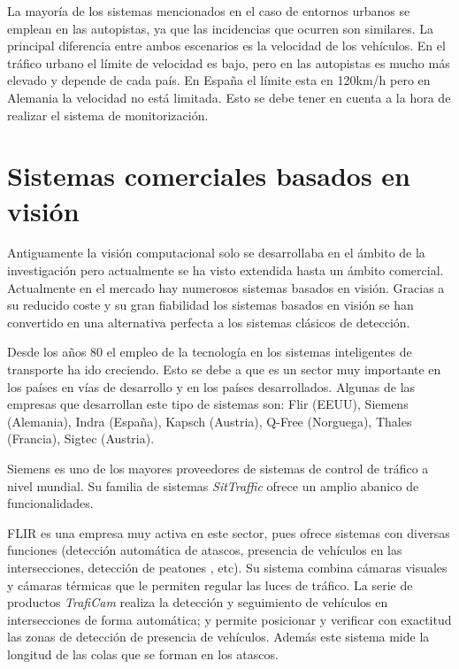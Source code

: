 La mayoría de los sistemas mencionados en el caso de entornos urbanos se emplean en las autopistas, ya que las incidencias que ocurren son similares. La principal diferencia entre ambos escenarios es la velocidad de los vehículos. En el tráfico urbano el límite de velocidad es bajo, pero en las autopistas es mucho más elevado y depende de cada país. En España el límite esta en 120km/h pero en Alemania la velocidad no está limitada. Esto se debe tener en cuenta a la hora de realizar el sistema de monitorización.

\section{Sistemas comerciales basados en visión}

Antiguamente la visión computacional solo se desarrollaba en el ámbito de la investigación pero actualmente se ha visto extendida hasta un ámbito comercial. Actualmente en el mercado hay numerosos sistemas basados en visión. Gracias a su reducido coste y su gran fiabilidad los sistemas basados en visión se han convertido en una alternativa perfecta a los sistemas clásicos de detección.

Desde los años 80 el empleo de la tecnología en los sistemas inteligentes de transporte ha ido creciendo. Esto se debe a que es un sector muy importante en los países en vías de desarrollo y en los países desarrollados. Algunas de las empresas que desarrollan este tipo de sistemas son: Flir (EEUU), Siemens (Alemania), Indra (España), Kapsch (Austria), Q-Free (Norguega), Thales (Francia), Sigtec (Austria).

Siemens es uno de los mayores proveedores de sistemas de control de tráfico a nivel mundial. Su familia de sistemas \textit{SitTraffic} ofrece un amplio abanico de funcionalidades.

FLIR es una empresa muy activa en este sector, pues ofrece sistemas con diversas funciones (detección automática de atascos, presencia de vehículos en las intersecciones, detección de peatones , etc).  Su sistema combina cámaras visuales y cámaras térmicas que le permiten regular las luces de tráfico. La serie de productos \textit{TrafiCam} realiza la detección y seguimiento de vehículos en intersecciones de forma automática; y permite posicionar y verificar con exactitud las zonas de detección de presencia de vehículos. Además este sistema mide la longitud de las colas que se forman en los atascos.

